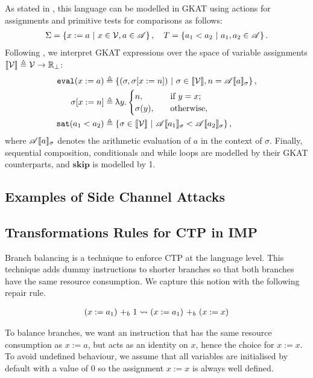As stated in \cite{GKAT}, this language can be modelled in GKAT using actions for assignments and primitive tests for comparisons as follows:
\begin{align}
\Sigma=\set{x:=a\ |\ x\in \Variable, a\in \mathscr{A}}, \quad T=\set{a_1 < a_2\ |\ a_1,a_2\in \mathscr{A}}.
\end{align}
Following \cite{GKAT}, we interpret GKAT expressions over the space of variable assignments $\semantics{\Variable}\triangleq\Variable \rightarrow\Real_\perp$:
\begin{align*}
\eval(x:=a)&\triangleq \set{(\sigma, \sigma[x:=n])\ |\  \sigma \in \semantics{\Variable}, n=\mathscr{A}\semantics{a}_\sigma},\\
\sigma[x:=n]&\triangleq \uplambda y \ldotp 
	\begin{cases}
		n, \quad &\text{if $y=x$};\\
		\sigma(y), \quad&\text{otherwise},
	\end{cases}\\
\sat(a_1<a_2)&\triangleq \set{\sigma \in \semantics{\Variable}\ |\ \mathscr{A}\semantics{a_1}_{\sigma} < \mathscr{A}\semantics{a_2}_{\sigma}},
\end{align*}
where $\mathscr{A}\semantics{a}_\sigma$ denotes the arithmetic evaluation of $a$ in the context of $\sigma$. Finally, sequential composition, conditionals and while loops are modelled by their GKAT counterparts, and $\mathbf{skip}$ is modelled by 1.



\subsection{Examples of Side Channel Attacks}

\subsection{Transformations Rules for CTP in IMP}
Branch balancing is a technique to enforce CTP at the language level. This technique adds dummy instructions to shorter branches so that both branches have the same resource consumption. We capture this notion with the following repair rule.
\begin{definition}
\begin{align*}
\branch{b}{(x:=a_1)}{1} \leadsto \branch{b}{(x:=a_1)}{(x:=x)}
\end{align*}
\end{definition}
To balance branches, we want an instruction that has the same resource consumption as $x:=a$, but acts as an identity on $x$, hence the choice for $x:=x$.  To avoid undefined behaviour, we assume that all variables are initialised by default with a value of 0 so the assignment $x:=x$ is always well defined. 


